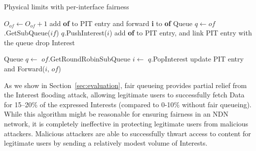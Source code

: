 \begin{algorithm}[h]
\caption{Physical limits with per-interface fairness}
\label{alg:queuing}
\begin{algorithmic}[1]
\State{} 

\vspace{0.2cm}

     
        \State $O_{of} \leftarrow O_{of} + 1$  
        \State add \textbf{of} to PIT entry and forward \textbf{i} to \textbf{of}
    \Else
        \State Queue $q \leftarrow of$.GetSubQueue($if$)
           \State $q$.PushInterest($i$)
           \State add \textbf{of} to PIT entry, and link PIT entry with the queue
        \Else
           \State drop Interest
        \EndIf
    \EndIf
\EndFunction

\vspace{0.2cm}
\State{} 
    \State Queue $q \leftarrow$ $of$.GetRoundRobinSubQueue 
    \State $i \leftarrow$ $q$.PopInterest
    \State update PIT entry and Forward($i$, $of$)
\EndFunction
\end{algorithmic}
\end{algorithm}


As we show in Section~\ref{sec:evaluation}, fair queueing provides partial relief from the Interest flooding attack, allowing legitimate users to successfully fetch Data for 15--20\% of the expressed Interests (compared to 0-10\% without fair queueing). While this algorithm might be reasonable for ensuring fairness in an NDN network, it is completely ineffective in protecting legitimate users from malicious attackers. Malicious attackers are able to successfully thwart access to content for legitimate users by sending a relatively modest volume of Interests.



